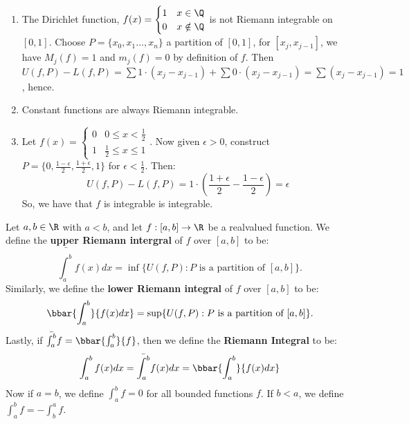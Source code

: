 \begin{example}
    \begin{enumerate}[label=(\arabic*)]
        \item The Dirichlet function, $f(x)=\begin{cases}
                1 & x \in \Q \\
                0 & x \notin \Q \\
            \end{cases}$
            is not Riemann integrable on $[0,1]$.
            Choose $P=\{x_0,x_1 \dots , x_n\}$ a partition of $[0,1]$, for  $[x_j,x_{j-1}]$, we have  $M_j(f)=1$ and  $m_j(f)=0$ by definition of  $f$. Then  $U(f,P)-L(f,P)=\sum{1 \cdot (x_j-x_{j-1})}+\sum{0 \cdot (x_j-x_{j-1})}=\sum{(x_j-x_{j-1})}=1$, hence.

    \item Constant functions are always Riemann integrable.

    \item Let $f(x)=\begin{cases}
            0 & 0 \leq x<\frac{1}{2} \\
            1 & \frac{1}{2} \leq x \leq 1
        \end{cases}$.
        Now given $\epsilon>0$, construct  $P=\{0,\frac{1-\epsilon}{2},\frac{1+\epsilon}{2},1\}$ for $\epsilon<\frac{1}{2}$. Then:
        \begin{equation}
            U(f,P)-L(f,P)= 1 \cdot (\frac{1+\epsilon}{2}-\frac{1-\epsilon}{2})=\epsilon		
        \end{equation} 
        So, we have that $f$ is integrable is integrable.
    \end{enumerate}
\end{example} 

\begin{definition}		
    Let $a,b \in \R$ with  $a<b$, and let  $f:[a,b] \rightarrow \R$ be a realvalued function.
    We define the \textbf{upper Riemann intergral} of $f$ over  $[a,b]$ to be:
        \begin{equation}
            \bar{\int_{a}^{b}}{f(x) dx}=\inf\{U(f,P):P \text{ is a partition of } [a,b]\}. 
        \end{equation}
    Similarly, we define the \textbf{lower Riemann integral} of $f$ over  $[a,b]$ to be:
        \begin{equation}
            \bbar{\int_{a}^{b}}{f(x) dx}=\sup\{U(f,P):P \text{ is a partition of } [a,b]\}. 
        \end{equation} 
        Lastly, if $\bar{\int_{a}^{b}}{f}=\bbar{\int_{a}^{b}}{f}$, then we define the \textbf{Riemann Integral} to be:
        \begin{equation}
            \int_{a}^{b}{f(x) dx}=\bar{\int_{a}^{b}}{f(x) dx}=\bbar{\int_{a}^{b}}{f(x) dx}
        \end{equation}
        Now if $a=b$, we define  $\int_{a}^{b}{f}=0$ for all bounded functions  $f$. If $b<a$, we define  $\int_{a}^{b}{f}=-\int_{b}^{a}{f}$.
\end{definition}


